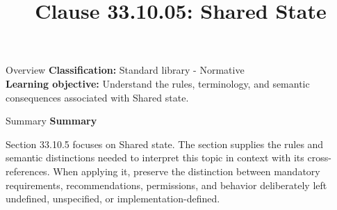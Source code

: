 \documentclass[10pt,letterpaper]{article}
\title{Clause 33.10.05: Shared State}
\author{}
\date{}
\begin{document}
\maketitle
\begin{CornellOverviewBox}{Overview}
\textbf{Classification:} Standard library - Normative\\[2pt]
\textbf{Learning objective:} Understand the rules, terminology, and semantic consequences associated with Shared state.
\end{CornellOverviewBox}\begin{CornellSummaryBox}{Summary}
{\sffamily\bfseries\color{Accent} Summary}\par\vspace{3pt}Section 33.10.5 focuses on Shared state. The section supplies the rules and semantic distinctions needed to interpret this topic in context with its cross-references. When applying it, preserve the distinction between mandatory requirements, recommendations, permissions, and behavior deliberately left undefined, unspecified, or implementation-defined.
\end{CornellSummaryBox}
\end{document}
